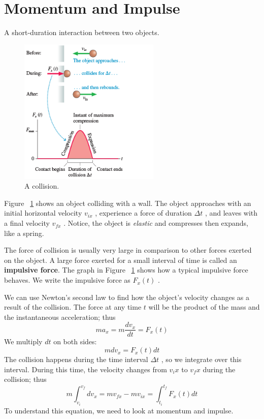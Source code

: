\section{Momentum and Impulse}

\begin{definition}[collision]
    A short-duration interaction between two objects.
\end{definition}

\begin{figure}
    \centering
    \includegraphics[width=0.6\textwidth]{../figures/collision-example.png}
    \caption{A collision.}%
    \label{fig:collision}
\end{figure}

Figure~%
\ref{fig:collision} shows an object colliding with a wall.  The object
approaches with an initial horizontal velocity
$
    v_{ix}
$%
, experience a force of duration
$
    \Delta t
$%
, and leaves with a final velocity
$
    v_{fx}
$%
.  Notice, the object is \emph{elastic} and compresses then expands,
like a spring.

The force of collision is usually very large in comparison to other
forces exerted on the object.  A large force exerted for a small
interval of time is called an \textbf{impulsive force}.  The graph in
Figure~%
\ref{fig:collision} shows how a typical impulsive force behaves.  We
write the impulsive force as
$
    F_x(t)
$%
.

We can use Newton's second law to find how the object's velocity changes
as a result of the collision.  The force at any time
$
    t
$ will be the product of the mass and the instantaneous acceleration;
thus
\begin{equation}
    ma_x=m\frac{dv_x}{dt}=F_x(t)
\end{equation}
We multiply
$
    dt
$ on both sides:
\begin{equation}
    m dv_x = F_x(t) dt
\end{equation}
The collision happens during the time interval
$
    \Delta t
$%
, so we integrate over this interval.  During this time, the velocity
changes from
$
    v_ix
$ to
$
    v_fx
$ during the collision; thus
\begin{equation}
    \label{eq:momentum-impulse-p1} m\int_{v_i}^{v_f} dv_x = mv_{fx}-mv_{ix}=\int_
    {t_i}^{t_f} F_x(t) dt
\end{equation}
To understand this equation, we need to look at momentum and impulse.

